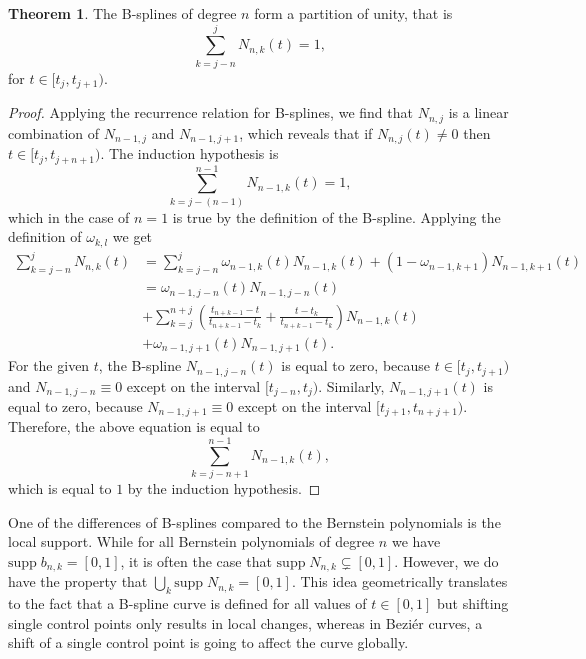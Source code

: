 \documentclass[a4paper, 11pt]{report}
\theoremstyle{definition}
\newtheorem{theorem}[definition]{Theorem}
\begin{document}
\begin{theorem}
	The B-splines of degree $n$ form a partition of unity, that is
	\begin{equation}
		\sum_{k=j-n}^j N_{n,k}(t) = 1,
	\end{equation}
	for $t \in [t_j, t_{j+1})$.
\end{theorem}
\begin{proof}
	Applying the recurrence relation for B-splines, we find that $N_{n,j}$ is a linear combination of $N_{n-1, j}$ and $N_{n-1, j+1}$, which reveals that if $N_{n, j}(t) \neq 0$ then $t \in [t_j, t_{j+n+1})$. The induction hypothesis is
	\begin{equation}
		\sum_{k=j-(n-1)}^{n-1} N_{n-1,k}(t) = 1,
	\end{equation}
	which in the case of $n=1$ is true by the definition of the B-spline. Applying the definition of $\omega_{k,l}$ we get
	\begin{align*}
		\sum_{k=j-n}^j N_{n,k}(t)	&= \sum_{k=j-n}^j \omega_{n-1, k}(t) N_{n-1, k}(t) + (1-\omega_{n-1, k+1}) N_{n-1, k+1}(t) \\
									&= \omega_{n-1, j-n}(t) N_{n-1, j-n}(t)\\
									&+ \sum_{k=j}^{n+j} \left(\frac{t_{n+k-1} - t}{t_{n+k-1} - t_{k}} + \frac{t - t_k}{t_{n+k-1} - t_k}\right) N_{n-1,k}(t)\\
									&+ \omega_{n-1, j+1}(t) N_{n-1, j+1}(t).
	\end{align*}
	For the given $t$, the B-spline $N_{n-1, j-n}(t)$ is equal to zero, because $t \in [t_j, t_{j+1})$ and $N_{n-1, j-n} \equiv 0$ except on the interval $[t_{j-n}, t_j)$.
	Similarly, $N_{n-1, j+1}(t)$ is equal to zero, because $N_{n-1, j+1} \equiv 0$ except on the interval $[t_{j+1}, t_{n+j+1})$. Therefore, the above equation is equal to
	\begin{equation}
		\sum_{k=j-n+1}^{n-1} N_{n-1,k}(t),
	\end{equation}
	which is equal to $1$ by the induction hypothesis.
\end{proof}

One of the differences of B-splines compared to the Bernstein polynomials is the local support. While for all Bernstein polynomials of degree $n$ we have $\text{supp}\;b_{n,k} = [0, 1]$, it is often the case that $\text{supp}\;N_{n,k} \subsetneq [0, 1]$. However, we do have the property that $\bigcup_k \text{supp} \; N_{n,k} = [0,1]$. This idea geometrically translates to the fact that a B-spline curve is defined for all values of $t \in [0,1]$ but shifting single control points only results in local changes, whereas in Beziér curves, a shift of a single control point is going to affect the curve globally.
\end{document}
